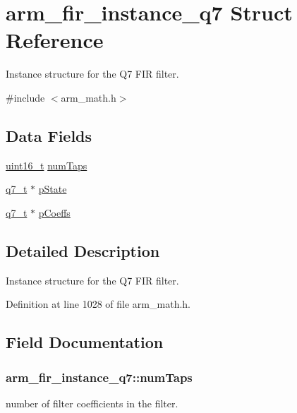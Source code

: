 \hypertarget{structarm__fir__instance__q7}{\section{arm\-\_\-fir\-\_\-instance\-\_\-q7 Struct Reference}
\label{structarm__fir__instance__q7}
}


Instance structure for the Q7 F\-I\-R filter.  




{\ttfamily \#include $<$arm\-\_\-math.\-h$>$}

\subsection*{Data Fields}
\begin{DoxyCompactItemize}
\item 
\hyperlink{stdint_8h_a273cf69d639a59973b6019625df33e30}{uint16\-\_\-t} \hyperlink{structarm__fir__instance__q7_a9b50840e2c5ef5b17e1a584fb4cf0d06}{num\-Taps}
\item 
\hyperlink{arm__math_8h_ae541b6f232c305361e9b416fc9eed263}{q7\-\_\-t} $\ast$ \hyperlink{structarm__fir__instance__q7_aaddea3b9c7e16ddfd9428b7bf9f9c200}{p\-State}
\item 
\hyperlink{arm__math_8h_ae541b6f232c305361e9b416fc9eed263}{q7\-\_\-t} $\ast$ \hyperlink{structarm__fir__instance__q7_a0e45aedefc3fffad6cb315c5b6e5bd49}{p\-Coeffs}
\end{DoxyCompactItemize}


\subsection{Detailed Description}
Instance structure for the Q7 F\-I\-R filter. 

Definition at line 1028 of file arm\-\_\-math.\-h.



\subsection{Field Documentation}
\hypertarget{structarm__fir__instance__q7_a9b50840e2c5ef5b17e1a584fb4cf0d06}{
\subsubsection[{num\-Taps}]{ arm\-\_\-fir\-\_\-instance\-\_\-q7\-::num\-Taps}}\label{structarm__fir__instance__q7_a9b50840e2c5ef5b17e1a584fb4cf0d06}
number of filter coefficients in the filter. 

